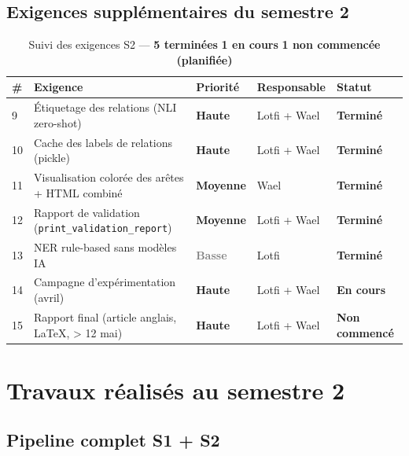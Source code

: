\documentclass[a4paper,11pt]{article}
\newcommand{\done}{\textcolor{done}{\textbf{Terminé}}}
\newcommand{\inprog}{\textcolor{inprog}{\textbf{En cours}}}
\newcommand{\notdone}{\textcolor{nottodo}{\textbf{Non commencé}}}
\newcommand{\high}{\textcolor{red!70!black}{\textbf{Haute}}}
\newcommand{\med}{\textcolor{orange!80!black}{\textbf{Moyenne}}}
\newcommand{\low}{\textcolor{gray}{\textbf{Basse}}}
\begin{document}
\subsection{Exigences supplémentaires du semestre 2}

\begin{table}[H]
  \centering
  \footnotesize
  \begin{tabularx}{\textwidth}{>{\centering}p{0.4cm}
                               X
                               >{\centering}p{1.5cm}
                               >{\centering}p{2.0cm}
                               >{\centering\arraybackslash}p{2.2cm}}
    \toprule
    \textbf{\#} & \textbf{Exigence} & \textbf{Priorité} & \textbf{Responsable} & \textbf{Statut} \\
    \midrule
    \rowcolor{rowdone}9  & Étiquetage des relations (NLI zero-shot) & \high & Lotfi + Wael & \done \\
    \rowcolor{rowdone}10 & Cache des labels de relations (pickle) & \high & Lotfi + Wael & \done \\
    \rowcolor{rowdone}11 & Visualisation colorée des arêtes + HTML combiné & \med & Wael & \done \\
    \rowcolor{rowdone}12 & Rapport de validation (\texttt{print\_validation\_report}) & \med & Lotfi + Wael & \done \\
    \rowcolor{rowdone}13 & NER rule-based sans modèles IA & \low & Lotfi & \done \\
    \rowcolor{rowinprog}14 & Campagne d'expérimentation (avril) & \high & Lotfi + Wael & \inprog \\
    \rowcolor{rownot}15  & Rapport final (article anglais, \LaTeX, > 12 mai) & \high & Lotfi + Wael & \notdone \\
    \bottomrule
  \end{tabularx}
  \caption{Suivi des exigences S2 ---
    \textcolor{done}{\textbf{5 terminées}} \textbullet{}
    \textcolor{inprog}{\textbf{1 en cours}} \textbullet{}
    \textcolor{nottodo}{\textbf{1 non commencée (planifiée)}}}
\end{table}

\section{Travaux réalisés au semestre 2}

\subsection{Pipeline complet S1 + S2}
\end{document}
